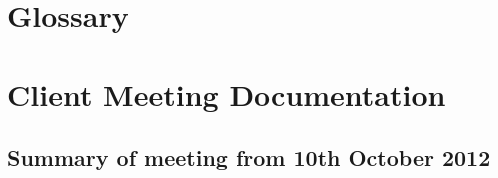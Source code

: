 \documentclass{l3deliverable}
\begin{document}
\appendix

\section{Glossary}



\section{Client Meeting Documentation}
\label{sec:clientMeetingDocs}


\subsection{Summary of meeting from 10th October 2012}


\end{document}
